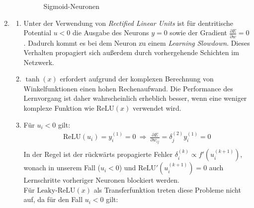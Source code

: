 \documentclass{article}
\newcommand{\relu}{\text{ReLU}}
\newcommand{\leakyrelu}{\text{Leaky-ReLU}}
\begin{document}
\begin{enumerate}
\begin{enumerate}[label=\alph*)]
\begin{figure}[H]
  \caption{Sigmoid-Neuronen}
\end{figure}
\end{enumerate}
\item
\begin{enumerate}[label=\alph*)]
\item
Unter der Verwendung von \textit{Rectified Linear Units} ist für dentritische Potential $u<0$ die Ausgabe des Neurons $y=0$ sowie der Gradient $\frac{\partial E}{\partial w}=0$. Dadurch kommt es bei dem Neuron zu einem \textit{Learning Slowdown}. Dieses Verhalten propagiert sich außerdem durch vorhergehende Schichten im Netzwerk.
\item
$\tanh(x)$ erfordert aufgrund der komplexen Berechnung von Winkelfunktionen einen hohen Rechenaufwand.
Die Performance des Lernvorgang ist daher wahrscheinlich erheblich besser, wenn eine weniger komplexe Funktion wie $\text{ReLU}(x)$ verwendet wird.
\item
Für $u_i<0$ gilt:
\begin{align*}
\relu(u_i)=y_i^{(1)}=0 \ \Rightarrow \ \frac{\partial E}{\partial w_{ij}}=\delta_j^{(2)} y_i^{(1)}=0 \\
\end{align*}
In der Regel ist der rückwärts propagierte Fehler $\delta_i^{(k)} \propto f'(u_i^{(k+1)})$, wonach in unserem Fall ($u_i<0$) und $\relu'(u_i^{(k+1)})=0$ auch Lernschritte vorheriger Neuronen blockiert werden.\\
Für $\leakyrelu(x)$ als Transferfunktion treten diese Probleme nicht auf, da für den Fall $u_i<0$ gilt:

\end{enumerate}
\end{enumerate}
\end{document}
